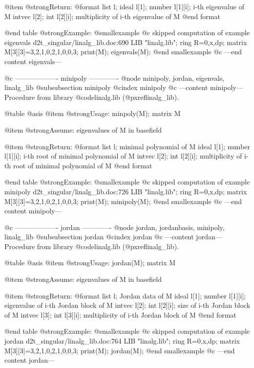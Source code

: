 @item @strong{Return:}
@format
list l; 
  ideal l[1];
    number l[1][i];  i-th eigenvalue of M
  intvec l[2]; 
    int l[2][i];  multiplicity of i-th eigenvalue of M
@end format

@end table
@strong{Example:}
@smallexample
@c skipped computation of example eigenvals d2t_singular/linalg_lib.doc:690 
LIB "linalg.lib";
ring R=0,x,dp;
matrix M[3][3]=3,2,1,0,2,1,0,0,3;
print(M);
eigenvals(M);
@end smallexample
@c ---end content eigenvals---

@c ------------------- minipoly -------------
@node minipoly, jordan, eigenvals, linalg_lib
@subsubsection minipoly
@cindex minipoly
@c ---content minipoly---
Procedure from library @code{linalg.lib} (@pxref{linalg_lib}).

@table @asis
@item @strong{Usage:}
minpoly(M); matrix M

@item @strong{Assume:}
eigenvalues of M in basefield

@item @strong{Return:}
@format
list l;  minimal polynomial of M
  ideal l[1]; 
    number l[1][i];  i-th root of minimal polynomial of M
  intvec l[2]; 
    int l[2][i];  multiplicity of i-th root of minimal polynomial of M
@end format

@end table
@strong{Example:}
@smallexample
@c skipped computation of example minipoly d2t_singular/linalg_lib.doc:726 
LIB "linalg.lib";
ring R=0,x,dp;
matrix M[3][3]=3,2,1,0,2,1,0,0,3;
print(M);
minipoly(M);
@end smallexample
@c ---end content minipoly---

@c ------------------- jordan -------------
@node jordan, jordanbasis, minipoly, linalg_lib
@subsubsection jordan
@cindex jordan
@c ---content jordan---
Procedure from library @code{linalg.lib} (@pxref{linalg_lib}).

@table @asis
@item @strong{Usage:}
jordan(M); matrix M

@item @strong{Assume:}
eigenvalues of M in basefield

@item @strong{Return:}
@format
list l;  Jordan data of M
  ideal l[1]; 
    number l[1][i];  eigenvalue of i-th Jordan block of M
  intvec l[2]; 
    int l[2][i];  size of i-th Jordan block of M
  intvec l[3]; 
    int l[3][i];  multiplicity of i-th Jordan block of M
@end format

@end table
@strong{Example:}
@smallexample
@c skipped computation of example jordan d2t_singular/linalg_lib.doc:764 
LIB "linalg.lib";
ring R=0,x,dp;
matrix M[3][3]=3,2,1,0,2,1,0,0,3;
print(M);
jordan(M);
@end smallexample
@c ---end content jordan---


